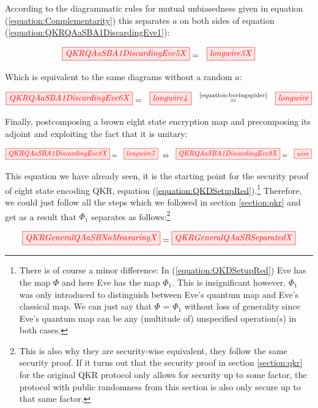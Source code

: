 \documentclass[]{article}
\newcommand{\equaltext}[1]{\ensuremath{\stackrel{\text{#1}}{=}}}
\begin{document}
According to the diagrammatic rules for mutual unbiasedness given in equation (\ref{equation:Complementarity}) this separates $a$ on both sides of equation (\ref{equation:QKRQAaSBA1DiscardingEve1}):

\begin{equation}
\label{QKRQAaSBA1DiscardingEve5}
\tikzfig{QKRQAaSBA1DiscardingEve5X} = ~~ \tikzfig{longwire3X}
\end{equation}

Which is equivalent to the same diagrams without a random $a$:

\begin{equation}
\tikzfig{QKRQAaSBA1DiscardingEve6X} = ~~ \tikzfig{longwire4} ~~ \equaltext{\ref{equation:boringspider}} ~~ \tikzfig{longwire}
\end{equation}

Finally, postcomposing a brown eight state encryption map and precomposing its adjoint and exploiting the fact that it is unitary:

\begin{equation}
\tikzfig{QKRQAaSBA1DiscardingEve8X} = ~~ \tikzfig{longwire5} ~ \Leftrightarrow ~~ \tikzfig{QKRQAaSBA1DiscardingEve9X} = ~~ \tikzfig{wire}
\end{equation}


This equation we have already seen, it is the starting point for the security proof of eight state encoding QKR, equation (\ref{equation:QKDSetupRed}).\footnote{There is of course a minor difference: In (\ref{equation:QKDSetupRed}) Eve has the map $\Phi$ and here Eve has the map $\Phi_1$. This is insignificant however. $\Phi_1$ was only introduced to distinguish between Eve's quantum map and Eve's classical map. We can just say that $\Phi$ = $\Phi_1$ without loss of generality since Eve's quantum map can be any (multitude of) unspecified operation(s) in both cases.} Therefore, we could just follow all the steps which we followed in section \ref{section:qkr} and get as a result that $\Phi_1$ separates as follows:\footnote{This is also why they are security-wise equivalent, they follow the same security proof. If it turns out that the security proof in section \ref{section:qkr} for the original QKR protocol only allows for security up to some factor, the protocol with public randomness from this section is also only secure up to that same factor.}

\begin{equation}
	\label{equation:QKRGeneralSeparation}
	\tikzfig{QKRGeneralQAaSBNoMeasuringX} = \tikzfig{QKRGeneralQAaSBSeparatedX}
\end{equation}
\end{document}
